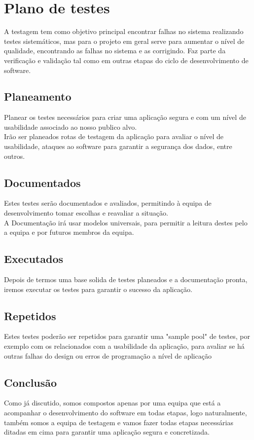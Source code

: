 \chapter{Plano de testes}
\label{plano_de_testes}
 A testagem tem como objetivo principal encontrar falhas no sistema realizando testes sistemáticos, mas para o projeto em geral serve para aumentar o nível de qualidade,  encontrando as falhas no sistema e as corrigindo. Faz parte da verificação e validação tal como em outras etapas do ciclo de desenvolvimento de software. 
 \section{Planeamento}
 Planear os testes necessários para criar uma aplicação segura e com um nível de usabilidade associado ao nosso publico alvo.\\
 Irão ser planeados rotas de testagem da aplicação para avaliar o nível de usabilidade, ataques ao software para garantir a segurança dos dados, entre outros.
 \section{Documentados}
 Estes testes serão documentados e avaliados, permitindo à equipa de desenvolvimento tomar escolhas e reavaliar a situação.\\
 A Documentação irá usar modelos universais, para permitir a leitura destes pelo a equipa e por futuros membros da equipa.
 \section{Executados}
 Depois de termos uma base solida de testes planeados e a documentação pronta, iremos executar os testes para garantir o sucesso da aplicação.
 \section{Repetidos}
 Estes testes poderão ser repetidos para garantir uma "sample pool" de testes, por exemplo com os relacionados com a usabilidade da aplicação, para avaliar se há outras falhas do design ou erros de programação a nível de aplicação\\
 \section{Conclusão}
Como já discutido, somos compostos apenas por uma equipa que está a acompanhar o desenvolvimento do software em todas etapas, logo naturalmente, também somos a equipa de testagem e vamos fazer todas etapas necessárias ditadas em cima para garantir uma aplicação segura e concretizada.